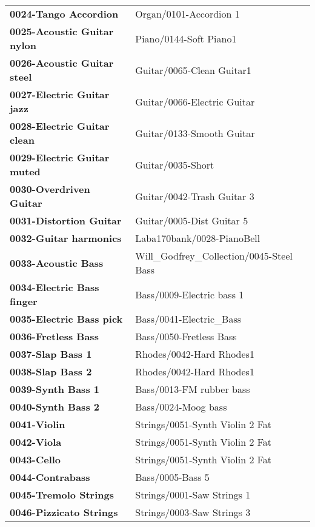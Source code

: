 \begin{longtable}{|l l|}
      \textbf{0024-Tango Accordion} &
         Organ/0101-Accordion 1 \\
      \textbf{0025-Acoustic Guitar nylon} &
         Piano/0144-Soft Piano1 \\
      \textbf{0026-Acoustic Guitar steel} &
         Guitar/0065-Clean Guitar1 \\
      \textbf{0027-Electric Guitar jazz} &
         Guitar/0066-Electric Guitar \\
      \textbf{0028-Electric Guitar clean} &
         Guitar/0133-Smooth Guitar \\
      \textbf{0029-Electric Guitar muted} &
         Guitar/0035-Short \\
      \textbf{0030-Overdriven Guitar} &
         Guitar/0042-Trash Guitar 3 \\
      \textbf{0031-Distortion Guitar} &
         Guitar/0005-Dist Guitar 5 \\
      \textbf{0032-Guitar harmonics} &
         Laba170bank/0028-PianoBell \\
      \textbf{0033-Acoustic Bass} &
         Will\_Godfrey\_Collection/0045-Steel Bass \\
      \textbf{0034-Electric Bass finger} &
         Bass/0009-Electric bass 1 \\
      \textbf{0035-Electric Bass pick} &
         Bass/0041-Electric\_Bass \\
      \textbf{0036-Fretless Bass} &
         Bass/0050-Fretless Bass \\
      \textbf{0037-Slap Bass 1} &
         Rhodes/0042-Hard Rhodes1 \\
      \textbf{0038-Slap Bass 2} &
         Rhodes/0042-Hard Rhodes1 \\
      \textbf{0039-Synth Bass 1} &
         Bass/0013-FM rubber bass \\
      \textbf{0040-Synth Bass 2} &
         Bass/0024-Moog bass \\
      \textbf{0041-Violin} &
         Strings/0051-Synth Violin 2 Fat \\
      \textbf{0042-Viola} &
         Strings/0051-Synth Violin 2 Fat \\
      \textbf{0043-Cello} &
         Strings/0051-Synth Violin 2 Fat \\
      \textbf{0044-Contrabass} &
         Bass/0005-Bass 5 \\
      \textbf{0045-Tremolo Strings} &
         Strings/0001-Saw Strings 1 \\
      \textbf{0046-Pizzicato Strings} &
         Strings/0003-Saw Strings 3 \\

\end{longtable}
